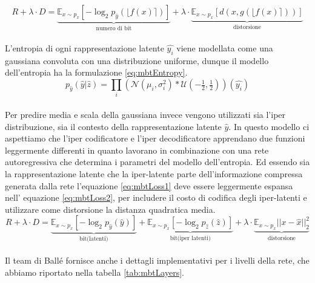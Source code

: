 \begin{equation}\label{eq:mbtLoss1}
    R + \lambda \cdot D = \underbrace{\mathbb{E}_{x \sim p_{x}}[-\log_{2} p_{\hat{y}}(\lfloor f(x) \rceil)]}_{\textrm{numero di bit}} + \lambda \cdot \underbrace{\mathbb{E}_{x \sim p_{x}}[d(x,g(\lfloor f(x) \rceil))]}_{\textrm{distorsione}}
\end{equation}\\
L’entropia di ogni rappresentazione latente $\hat{y_{i}}$ viene modellata come una gaussiana convoluta con una distribuzione uniforme, dunque il modello dell’entropia ha la formulazione \ref{eq:mbtEntropy}.
\begin{equation}\label{eq:mbtEntropy}
    p_{\hat{y}}(\hat{y}|\hat{z}) = \prod_{i}(\mathcal{N}(\mu_{i},\sigma_{i}^{2})*\mathcal{U}(-\tfrac{1}{2},\tfrac{1}{2}))(\hat{y_{i}})
\end{equation}\\
Per predire media e scala della gaussiana invece vengono utilizzati sia l’iper distribuzione, sia il contesto della rappresentazione latente $\hat{y}$.
In questo modello ci aspettiamo che l’iper codificatore e l’iper decodificatore apprendano due funzioni leggermente differenti in quanto lavorano in combinazione con una rete autoregressiva che determina i parametri del modello dell’entropia. Ed essendo sia la rappresentazione latente che la iper-latente parte dell’informazione compressa generata dalla rete l’equazione \ref{eq:mbtLoss1} deve essere leggermente espansa nell' equazione \ref{eq:mbtLoss2}, per includere il costo di codifica degli iper-latenti e utilizzare come distorsione la distanza quadratica media.\\
\begin{equation}\label{eq:mbtLoss2}
    R + \lambda \cdot D = \underbrace{\mathbb{E}_{x \sim p_{x}}[-\log_{2} p_{\hat{y}}(\hat{y})]}_{\textrm{bit(latenti)}} + \underbrace{\mathbb{E}_{x \sim p_{x}}[-\log_{2} p_{\hat{z}}(\hat{z})]}_{\textrm{bit(iper latenti)}} + \lambda \cdot \underbrace{\mathbb{E}_{x \sim p_{x}}||x-\hat{x}||_{2}^{2}}_{\textrm{distorsione}}
\end{equation}\\
Il team di Ballé fornisce anche i dettagli implementativi per i livelli della rete, che abbiamo riportato nella tabella \ref{tab:mbtLayers}.
